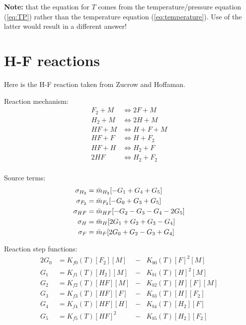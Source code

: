 \documentclass{article}
\begin{document}
{\bf Note:} that the equation for $T$ comes from the temperature/pressure equation (\ref{eq:TP})  rather than
the temperature equation (\ref{eq:temperature}). Use of the latter would result in
a different answer! 



\section{H-F reactions}

Here is the H-F reaction taken from Zucrow and Hoffaman.

Reaction mechanism:
\begin{align*}
  F_2 + M & \Leftrightarrow 2 F + M \\
  H_2 + M & \Leftrightarrow 2H + M   \\
  HF + M & \Leftrightarrow H + F + M \\
  HF + F & \Leftrightarrow H + F_2   \\
  HF + H & \Leftrightarrow H_2 + F   \\
 2HF     & \Leftrightarrow H_2 + F_2 \\
\end{align*}

Source terms:
\begin{align*}
   \sigma_{H_2} &= \bar{m}_{H_2} [ -G_1 + G_4 + G_5 ] \\
   \sigma_{F_2} &= \bar{m}_{F_2} [ -G_0 + G_3 + G_5 ] \\
   \sigma_{HF}  &= \bar{m}_{HF}  [ -G_2 -G_3-G_4-2G_5 ] \\
   \sigma_{H}   &= \bar{m}_{H}   [ 2G_1+G_2+G_3-G_4 ] \\
   \sigma_{F}   &= \bar{m}_{F}   [ 2G_0 + G_2 - G_3 + G_4 ] 
\end{align*}

Reaction step functions:
\begin{alignat*}{2}
  G_0 & = K_{f0}(T) [F_2] [M] &-& K_{b0}(T) [F]^2 [M] \\
  G_1 & = K_{f1}(T) [H_2] [M] &-& K_{b1}(T) [H]^2 [M] \\
  G_2 & = K_{f2}(T) [HF]  [M] &-& K_{b2}(T) [H][F][M] \\
  G_3 & = K_{f3}(T) [HF]  [F] &-& K_{b3}(T) [H] [F_2] \\
  G_4 & = K_{f4}(T) [HF]  [H] &-& K_{b4}(T) [H_2] [F] \\
  G_5 & = K_{f5}(T) [HF]^2    &-& K_{b5}(T) [H_2][F_2] 
\end{alignat*}
\end{document}
